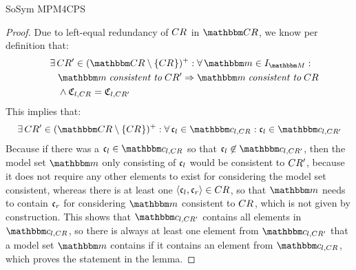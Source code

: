 \begin{copiedFrom}{SoSym MPM4CPS}
\begin{proof}
    Due to left-equal redundancy of $CR_{}$ in $\consistencyrelationset{CR}$, we know per definition that:
    \begin{align*}
        \formulaskip &
        \exists \consistencyrelation{CR'}{} \in \transitiveclosure{(\consistencyrelationset{CR} \setminus \setted{\consistencyrelation{CR}{}})} :
        \forall \modelset{m} \in \metamodelinstances{\metamodelset{M}} : \\
        & \formulaskip
        \modelset{m} \consistenttomath \consistencyrelation{CR'}{} \Rightarrow \modelset{m} \consistenttomath \consistencyrelation{CR}{} \\
        & \formulaskip
        \land 
        \classtuple{C}{l,\consistencyrelation{CR}{}} = \classtuple{C}{l,\consistencyrelation{CR'}{}}
    \end{align*}
    This implies that:
    \begin{align*}
        \formulaskip &
        \exists \consistencyrelation{CR'}{} \in \transitiveclosure{(\consistencyrelationset{CR} \setminus \setted{\consistencyrelation{CR}{}})} :
        \forall \conditionelement{c}{l} \in \condition{c}{l,\consistencyrelation{CR}{}} :
        \conditionelement{c}{l} \in \condition{c}{l,\consistencyrelation{CR'}{}}
    \end{align*}
    Because if there was a $\conditionelement{c}{l} \in \condition{c}{l,\consistencyrelation{CR}{}}$ so that $\conditionelement{c}{l} \not\in \condition{c}{l,\consistencyrelation{CR'}{}}$, then the model set $\modelset{m}$ only consisting of $\mathfrak{c}_{l}$ would be consistent to $CR'_{}$, because it does not require any other elements to exist for considering the model set consistent, whereas there is at least one $\langle \mathfrak{c}_{l}, \mathfrak{c}_{r} \rangle \in CR_{}$, so that $\modelset{m}$ needs to contain $\mathfrak{c}_{r}$ for considering $\modelset{m}$ consistent to $CR_{}$, which is not given by construction.
    This shows that $\condition{c}{l,\consistencyrelation{CR'}{}}$ contains all elements in $\condition{c}{l,\consistencyrelation{CR}{}}$, so there is always at least one element from $\condition{c}{l,\consistencyrelation{CR'}{}}$ that a model set $\modelset{m}$ contains if it contains an element from $\condition{c}{l,\consistencyrelation{CR}{}}$, %
    which proves the statement in the lemma.
\end{proof}


\end{copiedFrom}
